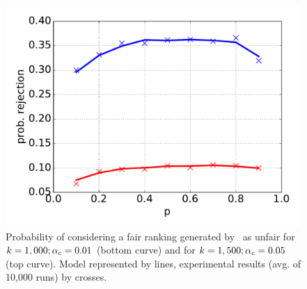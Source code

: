 \begin{figure}[t]
	\includegraphics[width=.55\columnwidth]{pics/FailureProbability10000Trials.png}
	\vspace{-2mm}
	\caption{Probability of considering a fair ranking generated by~\cite{yang2016measuring} as unfair for $k=1,000; \alpha_c=0.01$ (bottom curve) and for $k=1,500; \alpha_c=0.05$ (top curve). Model represented by lines, experimental results (avg. of 10,000 runs) by crosses.}
	\vspace{-5mm}
	\label{fig:julia-experimental-verification}
\end{figure}

